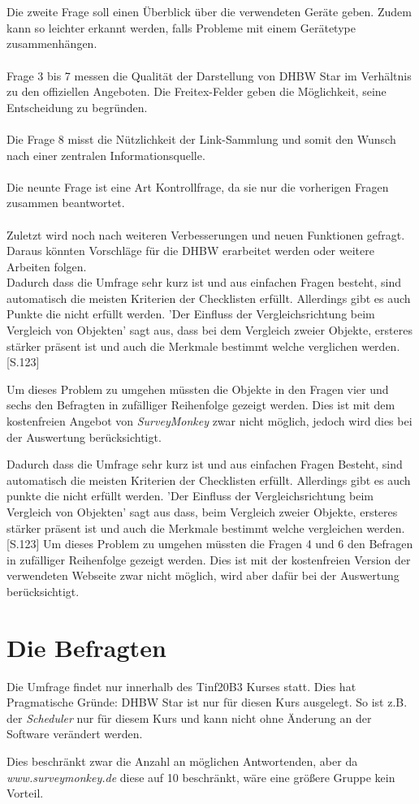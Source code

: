\\\\
Die zweite Frage soll einen Überblick über die verwendeten Geräte geben. Zudem kann so leichter erkannt werden, falls Probleme mit einem Gerätetype zusammenhängen.
\\\\
Frage 3 bis 7 messen die Qualität der Darstellung von DHBW Star im Verhältnis zu den offiziellen Angeboten. Die Freitex-Felder geben die Möglichkeit, seine Entscheidung zu begründen.
\\\\
Die Frage 8 misst die Nützlichkeit der Link-Sammlung und somit den Wunsch nach einer zentralen Informationsquelle.
\\\\
Die neunte Frage ist eine Art Kontrollfrage, da sie nur die vorherigen Fragen zusammen beantwortet.
\\\\
Zuletzt wird noch nach weiteren Verbesserungen und neuen Funktionen gefragt. Daraus könnten Vorschläge für die DHBW erarbeitet werden oder weitere Arbeiten folgen.
\\
Dadurch dass die Umfrage sehr kurz ist und aus einfachen Fragen besteht, sind automatisch die meisten Kriterien der Checklisten erfüllt. Allerdings gibt es auch Punkte die nicht erfüllt werden. 'Der Einfluss der Vergleichsrichtung beim Vergleich von Objekten' sagt aus, dass bei dem Vergleich zweier Objekte, ersteres stärker präsent ist und auch die Merkmale bestimmt welche verglichen werden. \cite{fragebogenRolf} [S.123]

Um dieses Problem zu umgehen müssten die Objekte in den Fragen vier und sechs den Befragten in zufälliger Reihenfolge gezeigt werden. Dies ist mit dem kostenfreien Angebot von \emph{SurveyMonkey} zwar nicht möglich, jedoch wird dies bei der Auswertung berücksichtigt.

Dadurch dass die Umfrage sehr kurz ist und aus einfachen Fragen Besteht, sind automatisch die meisten Kriterien der Checklisten erfüllt. Allerdings gibt es auch punkte die nicht erfüllt werden. 'Der Einfluss der Vergleichsrichtung beim Vergleich von Objekten' sagt aus dass, beim Vergleich zweier Objekte, ersteres stärker präsent ist und auch die Merkmale bestimmt welche vergleichen werden. \cite{fragebogenRolf} [S.123]
Um dieses Problem zu umgehen müssten die Fragen 4 und 6 den Befragen in zufälliger Reihenfolge gezeigt werden. Dies ist mit der kostenfreien Version der verwendeten Webseite zwar nicht möglich,
wird aber dafür bei der Auswertung berücksichtigt.

\section{Die Befragten}
Die Umfrage findet nur innerhalb des Tinf20B3 Kurses statt. Dies hat Pragmatische Gründe: DHBW Star ist nur für diesen Kurs ausgelegt. So ist z.B. der \emph{Scheduler} nur für diesem Kurs und kann nicht ohne Änderung an der Software verändert werden.

Dies beschränkt zwar die Anzahl an möglichen Antwortenden, aber da \emph{www.surveymonkey.de} diese auf 10 beschränkt, wäre eine größere Gruppe kein Vorteil.